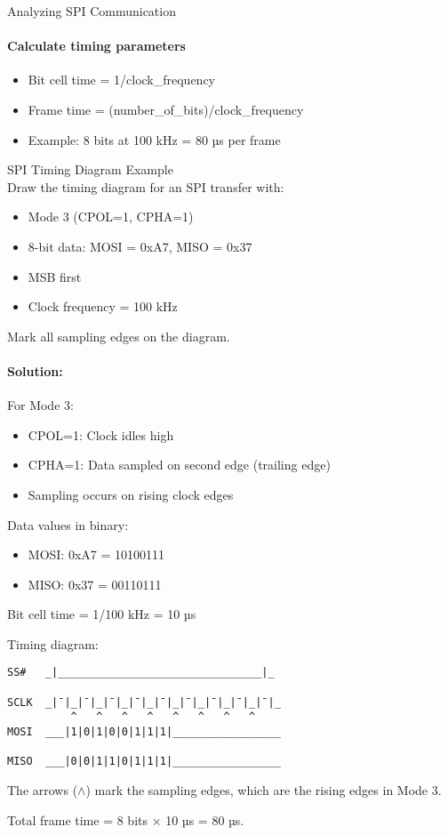 \begin{KR}{Analyzing SPI Communication}
\paragraph{Calculate timing parameters}
\begin{itemize}
    \item Bit cell time = 1/clock\_frequency
    \item Frame time = (number\_of\_bits)/clock\_frequency
    \item Example: 8 bits at 100 kHz = 80 µs per frame
\end{itemize}
\end{KR}

\begin{example2}{SPI Timing Diagram Example}\\
Draw the timing diagram for an SPI transfer with:
\begin{itemize}
    \item Mode 3 (CPOL=1, CPHA=1)
    \item 8-bit data: MOSI = 0xA7, MISO = 0x37
    \item MSB first
    \item Clock frequency = 100 kHz
\end{itemize}
Mark all sampling edges on the diagram.

\tcblower
\paragraph{Solution:}
For Mode 3:
\begin{itemize}
    \item CPOL=1: Clock idles high
    \item CPHA=1: Data sampled on second edge (trailing edge)
    \item Sampling occurs on rising clock edges
\end{itemize}

Data values in binary:
\begin{itemize}
    \item MOSI: 0xA7 = 10100111
    \item MISO: 0x37 = 00110111
\end{itemize}

Bit cell time = 1/100 kHz = 10 µs

Timing diagram:
\begin{verbatim}
SS#   _|________________________________|_
          
SCLK  _|¯|_|¯|_|¯|_|¯|_|¯|_|¯|_|¯|_|¯|_|¯|_
          ^   ^   ^   ^   ^   ^   ^   ^
MOSI  ___|1|0|1|0|0|1|1|1|_________________
          
MISO  ___|0|0|1|1|0|1|1|1|_________________
\end{verbatim}

The arrows ($\wedge$) mark the sampling edges, which are the rising edges in Mode 3.

Total frame time = 8 bits × 10 µs = 80 µs.
\end{example2}

